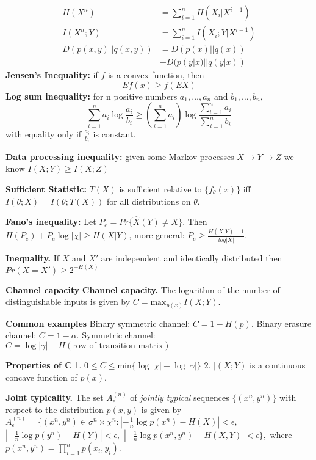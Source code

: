 \documentclass[10pt]{article}
\begin{document}
\begin{tiny}
\begin{multicols}{3}
\begin{align}
H(X^n)&=\sum_{i=1}^n H(X_i|X^{i-1})\\
I(X^n;Y)&=\sum_{i=1}^n I(X_i;Y|X^{i-1})\\
D(p(x,y)||q(x,y))&=D(p(x)||q(x))\\
&+D(p(y|x)||q(y|x))
\end{align}
{\bf Jensen's Inequality:} if $f$ is a convex function, then
\begin{equation}
Ef(x) \geq f(EX)
\end{equation}
{\bf Log sum inequality:} for n positive numbers $a_1,\ldots,a_n$ and $b_1,\ldots,b_n$,
\begin{equation}
\sum_{i=1}^n a_i \log \frac{a_i}{b_i} \geq \left( \sum_{i=1}^n a_i \right) \log \frac{\sum_{i=1}^n a_i}{\sum_{i=1}^n b_i}
\end{equation}
with equality only if $\frac{a_i}{b_i}$ is constant. 

{\bf Data processing inequality:} given some Markov processes $X\rightarrow Y\rightarrow Z$ we know $I(X;Y)\geq I(X;Z)$

{\bf Sufficient Statistic:} $T(X)$ is sufficient relative to $\{f_\theta (x)\}$ iff $I(\theta;X)=I(\theta;T(X))$ for all distributions on $\theta$.

{\bf Fano's inequality:} Let $P_e=Pr\{\hat{X}(Y)\neq X\}$. Then $H(P_e)+P_e \log |\chi| \geq H(X|Y)$, more general: $P_e \geq \frac{H(X|Y)-1}{log|X|}$.

{\bf Inequality.} If $X$ and $X'$ are independent and identically distributed then $Pr(X=X') \geq 2^{-H(X)}$


\textbf{\scriptsize Channel capacity}
{\bf Channel capacity.} The logarithm of the number of distinguishable inputs is given by $ C= \text{max}_{p(x)} I(X;Y).$

{\bf Common examples} Binary symmetric channel: $C= 1 - H(p)$. Binary erasure channel: $C = 1 - \alpha$. Symmetric channel: $C= \log |\gamma | - H(\text{row of transition matrix})$

{\bf Properties of C}  1. $0 \leq C \leq \text{min}\{\log |\chi| - \log | \gamma | \}$  2. $|(X;Y)$ is a continuous concave function of $p(x)$.

{\bf Joint typicality.}  The set $A_{\epsilon}^{(n)}$ of {\it jointly typical} sequences $\{(x^{n},y^{n})\}$ with respect to the distribution $p(x,y)$ is given by $A_{\epsilon}^{(n)} = \{ (x^{n},y^{n}) \in \sigma^{n} \times \chi^{n}: \left| -\frac{1}{n}\log p(x^{n}) - H(X) \right| < \epsilon, $ $\left| -\frac{1}{n}\log p(y^{n}) - H(Y) \right| <\epsilon, $ $\left| -\frac{1}{n} \log p(x^{n},y^{n})-H(X,Y) \right| <\epsilon \}, $ where $p(x^{n},y^{n}) = \prod_{i=1}^{n}p(x_{i},y_{i}).$



\end{multicols}
\end{tiny}
\end{document}
